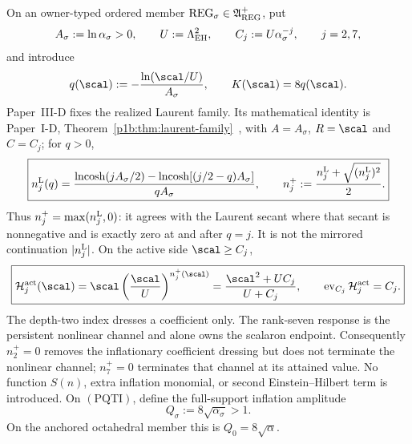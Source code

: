 \documentclass[11pt,a4paper]{article}
\begin{document}
\begin{definition}
\label{p3e:def:laur17-branch-data}
On an owner-typed ordered member
\(\mathrm{REG}_\sigma\in\mathfrak A_{\rm REG}^{+}\), put
\[
 A_\sigma:=\ln\alpha_\sigma>0,\qquad
 U:=\Lambda_{\rm EH}^2,\qquad
 C_j:=U\alpha_\sigma^{-j},\qquad j=2,7,
\]
and introduce
\[
 q(\scal):=-\frac{\ln(\scal/U)}{A_\sigma},
 \qquad K(\scal)=8q(\scal).
\]
Paper~III-D fixes the realized Laurent family.  Its mathematical identity
is Paper~I-D, Theorem~\ref{p1b:thm:laurent-family}~\cite{Kugelmann2026Paper1D},
with \(A=A_\sigma\), \(R=\scal\) and \(C=C_j\); for \(q>0\),
\begin{equation}
\label{p3e:eq:laur17-index-family}
 \boxed{
 n_j^{\rm L}(q)=
 \frac{\ln\!\cosh(jA_\sigma/2)
       -\ln\!\cosh[(j/2-q)A_\sigma]}
      {qA_\sigma},
 \qquad
 n_j^+:=\frac{n_j^{\rm L}+\sqrt{(n_j^{\rm L})^2}}2.}
\end{equation}
Thus \(n_j^+=\max(n_j^{\rm L},0)\): it agrees with the Laurent secant
where that secant is nonnegative and is exactly zero at and after \(q=j\).
It is not the mirrored continuation \(\lvert n_j^{\rm L}\rvert\).  On the
active side \(\scal\ge C_j\),
\begin{equation}
\label{p3e:eq:laur-active-response-family}
 \boxed{
 \mathcal H_j^{\rm act}(\scal)
 =\scal\left(\frac{\scal}{U}\right)^{n_j^+(\scal)}
 =\frac{\scal^2+UC_j}{U+C_j},
 \qquad
 \operatorname{ev}_{C_j}\mathcal H_j^{\rm act}=C_j.}
\end{equation}
The depth-two index dresses a coefficient only.  The rank-seven response is
the persistent nonlinear channel and alone owns the scalaron endpoint.
Consequently \(n_2^+=0\) removes the inflationary coefficient dressing but
does not terminate the nonlinear channel; \(n_7^+=0\) terminates that channel
at its attained value.  No function \(S(n)\), extra inflation monomial, or
second Einstein--Hilbert term is introduced.
On \((\mathrm{PQTI})\), define the full-support inflation amplitude
\begin{equation}
\label{p3e:eq:laur17-Q}
 \boxed{Q_\sigma:=8\sqrt{\alpha_\sigma}>1.}
\end{equation}
On the anchored octahedral member this is \(Q_0=8\sqrt\alpha\).
\end{definition}
\end{document}

